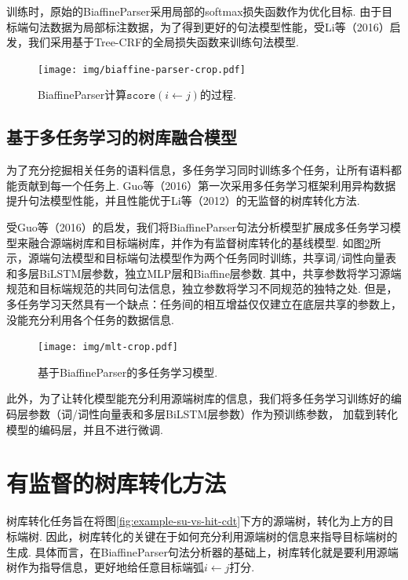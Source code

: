 训练时，原始的BiaffineParser采用局部的softmax损失函数作为优化目标.
由于目标端句法数据为局部标注数据，为了得到更好的句法模型性能，受Li等（2016）启发，我们采用基于Tree-CRF的全局损失函数来训练句法模型.

\begin{figure}[hb!]
    \centering
    \texttt{[image: img/biaffine-parser-crop.pdf]}
    \caption{BiaffineParser计算$\texttt{score}(i \leftarrow j)$的过程. }
    \label{fig:biaffineparser}
\end{figure}

\subsection{基于多任务学习的树库融合模型}
为了充分挖掘相关任务的语料信息，多任务学习同时训练多个任务，让所有语料都能贡献到每一个任务上.
Guo等（2016）第一次采用多任务学习框架利用异构数据提升句法模型性能，并且性能优于Li等（2012）的无监督的树库转化方法.

受Guo等（2016）的启发，我们将BiaffineParser句法分析模型扩展成多任务学习模型来融合源端树库和目标端树库，并作为有监督树库转化的基线模型.
如图\ref{fig:mlt}所示，源端句法模型和目标端句法模型作为两个任务同时训练，共享词/词性向量表和多层BiLSTM层参数，独立MLP层和Biaffine层参数.
其中，共享参数将学习源端规范和目标端规范的共同句法信息，独立参数将学习不同规范的独特之处.
但是，多任务学习天然具有一个缺点：任务间的相互增益仅仅建立在底层共享的参数上，没能充分利用各个任务的数据信息.

\begin{figure}[hb!]
    \centering
    \texttt{[image: img/mlt-crop.pdf]}
    \caption{基于BiaffineParser的多任务学习模型. }
    \label{fig:mlt}
\end{figure}
此外，为了让转化模型能充分利用源端树库的信息，我们将多任务学习训练好的编码层参数（词/词性向量表和多层BiLSTM层参数）作为预训练参数，
加载到转化模型的编码层，并且不进行微调.

\section{有监督的树库转化方法}
树库转化任务旨在将图\ref{fig:example-su-vs-hit-cdt}下方的源端树，转化为上方的目标端树.
因此，树库转化的关键在于如何充分利用源端树的信息来指导目标端树的生成.
具体而言，在BiaffineParser句法分析器的基础上，树库转化就是要利用源端树作为指导信息，更好地给任意目标端弧$i \leftarrow j$打分.

